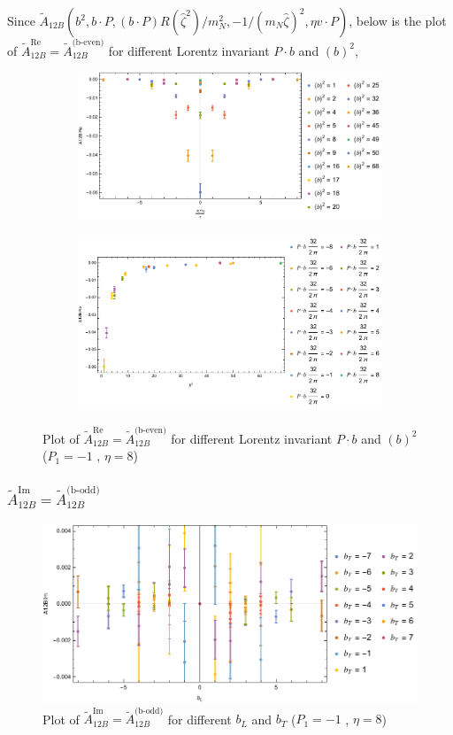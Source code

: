 \documentclass[]{article}
\numberwithin{equation}{section}
\newcommand{\tcdot}{{\cdot}}
\newcommand{\tAmp}{\widetilde{A}}
\newcommand{\tAmp}{\ensuremath{\widetilde{A}^{(+)}}}
\newcommand{\bvec}{b}
\newcommand{\mN}{m_N}
\newcommand{\zetahat}{{\hat \zeta}}
\begin{document}
Since $\tAmp_{12B}(\bvec^2,\bvec \tcdot P,(\bvec \tcdot P) R(\zetahat^2)/\mN^2,-1/(\mN\zetahat)^2,\eta v \tcdot P)$, below is the plot of $\tAmp^{\text{Re}}_{12B}=\tAmp^{\text{(b-even)}}_{12B}$ for different Lorentz invariant $P\cdot b$ and $(b)^2$,
\begin{figure}[h!]
     \centering
     \begin{subfigure}[b]{0.45\textwidth}
         \centering
         \includegraphics[width=\textwidth]{bP_A12B_b_even_P1_-1_eta_8.pdf}
     \end{subfigure}
     \begin{subfigure}[b]{0.45\textwidth}
         \centering
         \includegraphics[width=\textwidth]{bsq_A12B_b_even_P1_-1_eta_8.pdf}
     \end{subfigure}
        \caption{Plot of $\tAmp^{\text{Re}}_{12B}=\tAmp^{\text{(b-even)}}_{12B}$ for different Lorentz invariant $P\cdot b$ and $(b)^2$  ($P_{1} = -1$ , $\eta=8$)}
\end{figure}


\subsubsection{$\tAmp^{\text{Im}}_{12B}=\tAmp^{\text{(b-odd)}}_{12B}$}
\begin{figure}[h!]
    \centering
    \includegraphics[width=0.45\linewidth]{bLbT_A12B_b_odd_P1_-1_eta_8.pdf}
    \caption{Plot of  $\tAmp^{\text{Im}}_{12B}=\tAmp^{\text{(b-odd)}}_{12B}$ for different $b_{L}$ and $b_{T}$  ($P_{1} = -1$ , $\eta=8$)}
\end{figure}
\end{document}
